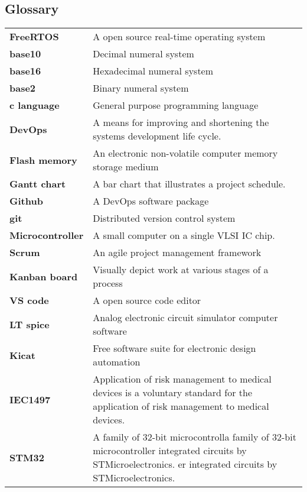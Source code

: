 \documentclass[../report.tex]{subfiles}
\begin{document}
\subsection{Glossary}
\begin{table}[H]
    \begin{center}
        \begin{tabularx}{\linewidth}{l L}
            \textbf{FreeRTOS} & A open source real-time operating system \\
            \textbf{base10} & Decimal numeral system \\
            \textbf{base16} & Hexadecimal numeral system \\
            \textbf{base2} & Binary numeral system \\
            \textbf{c language} & General purpose programming language \\
            \textbf{DevOps} & A means for improving and shortening the systems development life cycle. \\
            \textbf{Flash memory} & An electronic non-volatile computer memory storage medium \\
            \textbf{Gantt chart} & A bar chart that illustrates a project schedule. \\
            \textbf{Github} & A DevOps software package \\
            \textbf{git} & Distributed version control system \\
            \textbf{Microcontroller} & A small computer on a single VLSI IC chip. \\
            \textbf{Scrum} & An agile project management framework \\
            \textbf{Kanban board} & Visually depict work at various stages of a
            process\\
            \textbf{VS code} & A open source code editor\\
            \textbf{LT spice} & Analog electronic circuit simulator computer software\\
            \textbf{Kicat}& Free software suite for electronic design
            automation\\
            \textbf{IEC1497} & Application of risk management to medical
            devices is a voluntary standard for the application of risk
            management to medical devices.  \\
            \textbf{STM32} & A family of 32-bit microcontrolla family of 32-bit microcontroller integrated circuits by STMicroelectronics. er integrated circuits by STMicroelectronics. \\
        \end{tabularx}
    \end{center}
\end{table}
\end{document}
